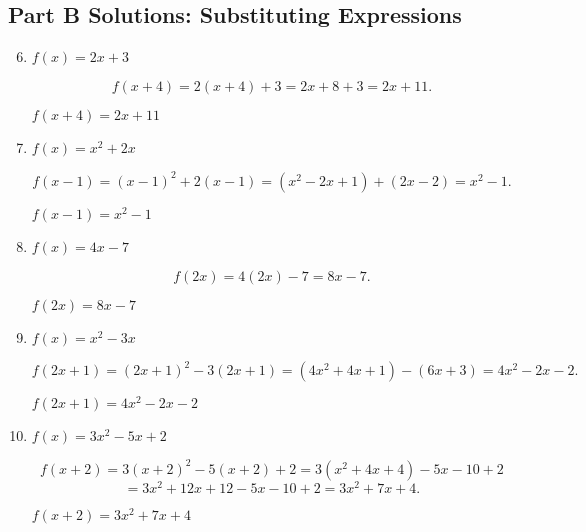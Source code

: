 \documentclass[12pt]{article}
\begin{document}
\subsection*{Part B Solutions: Substituting Expressions}
\begin{enumerate}
  \setcounter{enumi}{5}
  \item \(f(x) = 2x + 3\)

  \[
  f(x + 4) = 2(x + 4) + 3 = 2x + 8 + 3 = 2x + 11.
  \]

  \(\boxed{f(x + 4) = 2x + 11}\)

  \item \(f(x) = x^2 + 2x\)

  \[
  f(x - 1) = (x - 1)^2 + 2(x - 1)
  = (x^2 - 2x + 1) + (2x - 2)
  = x^2 - 1.
  \]

  \(\boxed{f(x - 1) = x^2 - 1}\)

  \item \(f(x) = 4x - 7\)

  \[
  f(2x) = 4(2x) - 7 = 8x - 7.
  \]

  \(\boxed{f(2x) = 8x - 7}\)

  \item \(f(x) = x^2 - 3x\)

  \[
  f(2x + 1) = (2x + 1)^2 - 3(2x + 1)
  = (4x^2 + 4x + 1) - (6x + 3)
  = 4x^2 - 2x - 2.
  \]

  \(\boxed{f(2x + 1) = 4x^2 - 2x - 2}\)

  \item \(f(x) = 3x^2 - 5x + 2\)

  \[
  f(x + 2) = 3(x + 2)^2 - 5(x + 2) + 2
  = 3(x^2 + 4x + 4) - 5x - 10 + 2
  \]
  \[
  = 3x^2 + 12x + 12 - 5x - 10 + 2
  = 3x^2 + 7x + 4.
  \]

  \(\boxed{f(x + 2) = 3x^2 + 7x + 4}\)
\end{enumerate}
\end{document}
